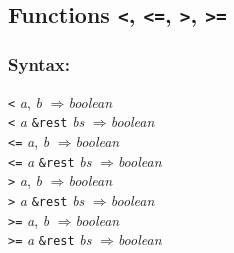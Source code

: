 \documentclass[10pt,fleqn]{article}
\newcommand{\CL}{\textsf{Common~Lisp}}
\newcommand{\code}[1]{\texttt{#1}}
\newcommand{\clieeeterm}[1]{\textit{#1}}
\newcommand{\varname}[1]{\textit{#1}}
\newcommand{\RArrow}{$\Rightarrow$}
\newcommand{\DDictionaryItem}[1]{\vspace*{6pt}\noindent\hrulefill\vspace*{-9pt}\subsection*{#1}}
\newcommand{\DSyntax}{\subsubsection*{Syntax:}}
\newcommand{\DExceptional}{\subsubsection*{Exceptional Situations:}}
\begin{document}









\DDictionaryItem{Functions \code{<}, \code{<=}, \code{>}, \code{>=}}
\index{*!\code{<}}
\index{*!\code{<=}}
\index{*!\code{>}}
\index{*!\code{>=}}

\DSyntax{}

\code{<} \varname{a}, \varname{b} \RArrow \varname{boolean}\\
\code{<} \varname{a} \code{\&rest} \varname{bs} \RArrow \varname{boolean}\\
\code{<=} \varname{a}, \varname{b} \RArrow \varname{boolean}\\
\code{<=} \varname{a} \code{\&rest} \varname{bs} \RArrow \varname{boolean}\\
\code{>} \varname{a}, \varname{b} \RArrow \varname{boolean}\\
\code{>} \varname{a} \code{\&rest} \varname{bs} \RArrow \varname{boolean}\\
\code{>=} \varname{a}, \varname{b} \RArrow \varname{boolean}\\
\code{>=} \varname{a} \code{\&rest} \varname{bs} \RArrow \varname{boolean}
\end{document}
